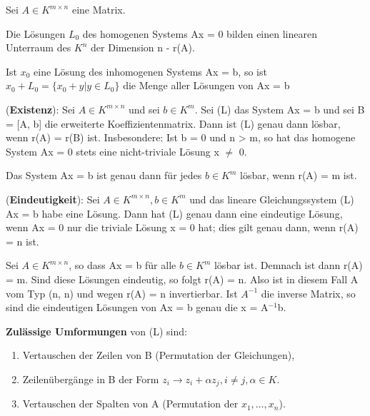 \begin{lemma}
Sei $A \in K^{m \times n}$ eine Matrix.
\begin{compactenum}
\item Die Lösungen $L_0$ des homogenen Systems Ax = 0 bilden einen linearen Unterraum des $K^n$ der Dimension n - r(A).
\item Ist $x_0$ eine Lösung des inhomogenen Systems Ax = b, so ist $x_0 + L_0 = \{x_0 +y | y \in L_0\}$ die Menge aller Lösungen von Ax = b
\end{compactenum}
\end{lemma}

\begin{proposition}
(\textbf{Existenz}): Sei $A \in K^{m \times n}$ und sei $b \in K^m$. Sei (L) das System Ax = b und sei B = [A, b] die erweiterte Koeffizientenmatrix. Dann ist (L) genau dann lösbar, wenn r(A) = r(B) ist. Insbesondere: Ist b = 0 und n > m, so hat das homogene System Ax = 0 stets eine nicht-triviale Lösung x $\neq$ 0.
\end{proposition}

\begin{remark}
Das System Ax = b ist genau dann für jedes $b \in K^m$ lösbar, wenn r(A) = m ist.
\end{remark}

\begin{proposition}
(\textbf{Eindeutigkeit}): Sei $A \in K^{m \times n},b \in K^m$ und das lineare Gleichungssystem (L) Ax = b habe eine Lösung. Dann hat (L) genau dann eine eindeutige Lösung, wenn Ax = 0 nur die triviale Lösung x = 0 hat; dies gilt genau dann, wenn r(A) = n ist.
\end{proposition}

\begin{remark}
Sei $A \in K^{m \times n}$, so dass Ax = b für alle $b \in K^m$ lösbar ist. Demnach ist dann r(A) = m. Sind diese Lösungen eindeutig, so folgt r(A) = n. Also ist in diesem Fall A vom Typ (n, n) und wegen r(A) = n invertierbar. Ist $A^{-1}$ die inverse Matrix, so sind die eindeutigen Lösungen von Ax = b genau die x = A$^{-1}$b.
\end{remark}

\textbf{Zulässige Umformungen} von (L) sind:
\begin{enumerate}
\item Vertauschen der Zeilen von B (Permutation der Gleichungen),
\item Zeilenübergänge in B der Form $z_i \to z_i+\alpha z_j, i \neq j,\alpha \in K$.
\item Vertauschen der Spalten von A (Permutation der $x_1, …, x_n$).
\end{enumerate}


